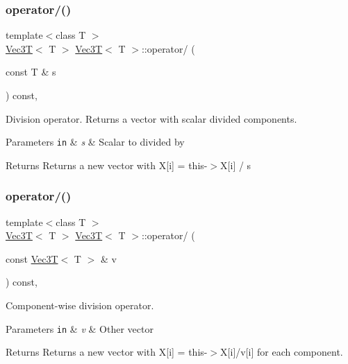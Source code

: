 \subsubsection{\texorpdfstring{operator/()}{operator/()}\hspace{0.1cm}{\footnotesize\ttfamily [1/2]}}
{\footnotesize\ttfamily template$<$class T $>$ \\
\hyperlink{classVec3T}{Vec3T}$<$ T $>$ \hyperlink{classVec3T}{Vec3T}$<$ T $>$\+::operator/ (\begin{DoxyParamCaption}\item[{const T \&}]{s }\end{DoxyParamCaption}) const\hspace{0.3cm}{\ttfamily [inline]}, {\ttfamily [noexcept]}}



Division operator. Returns a vector with scalar divided components. 


\begin{DoxyParams}[1]{Parameters}
\mbox{\tt in}  & {\em s} & Scalar to divided by \\
\hline
\end{DoxyParams}
\begin{DoxyReturn}{Returns}
Returns a new vector with X\mbox{[}i\mbox{]} = this-\/$>$X\mbox{[}i\mbox{]} / s 
\end{DoxyReturn}
\mbox{\label{classVec3T_a3c48111d27fb16cc3304e7aa2b4603fc}} 
\subsubsection{\texorpdfstring{operator/()}{operator/()}\hspace{0.1cm}{\footnotesize\ttfamily [2/2]}}
{\footnotesize\ttfamily template$<$class T $>$ \\
\hyperlink{classVec3T}{Vec3T}$<$ T $>$ \hyperlink{classVec3T}{Vec3T}$<$ T $>$\+::operator/ (\begin{DoxyParamCaption}\item[{const \hyperlink{classVec3T}{Vec3T}$<$ T $>$ \&}]{v }\end{DoxyParamCaption}) const\hspace{0.3cm}{\ttfamily [inline]}, {\ttfamily [noexcept]}}



Component-\/wise division operator. 


\begin{DoxyParams}[1]{Parameters}
\mbox{\tt in}  & {\em v} & Other vector \\
\hline
\end{DoxyParams}
\begin{DoxyReturn}{Returns}
Returns a new vector with X\mbox{[}i\mbox{]} = this-\/$>$X\mbox{[}i\mbox{]}/v\mbox{[}i\mbox{]} for each component. 
\end{DoxyReturn}
\mbox{\label{classVec3T_a9446e83162d3daee6133d12b354a3a41}} 
